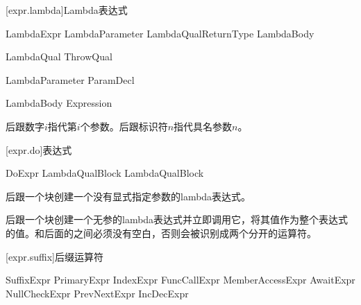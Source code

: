 [expr.lambda]{Lambda表达式}

\begin{bnf}{LambdaExpr}
    LambdaParameter LambdaQual\bnfs ReturnType\bnfq \terminal{=>} LambdaBody
\end{bnf}

\begin{bnf}{LambdaQual}
     \br
    ThrowQual
\end{bnf}

\begin{bnf}{LambdaParameter}
    ParamDecl
\end{bnf}

\begin{bnf}{LambdaBody}
    Expression
\end{bnf}

\pnum
\tcode{\$}后跟数字$i$指代第$i$个参数。\tcode{\$}后跟标识符$n$指代具名参数$n$。

[expr.do]{表达式}

\begin{bnf}{DoExpr}
     LambdaQual\bnfs Block \br
     LambdaQual\bnfs Block
\end{bnf}

\pnum
{}后跟一个块创建一个没有显式指定参数的lambda表达式。

\pnum
{}后跟一个块创建一个无参的lambda表达式并立即调用它，将其值作为整个表达式的值。\enternote {}和后面的\tcode{!}之间必须没有空白，否则会被识别成两个分开的运算符。\exitnote

\enterexample
{}
\exitexample

[expr.suffix]{后缀运算符}

\begin{bnf}{SuffixExpr}
    PrimaryExpr \br
    IndexExpr \br
    FuncCallExpr \br
    MemberAccessExpr \br
    AwaitExpr \br
    NullCheckExpr \br
    PrevNextExpr \br
    IncDecExpr
\end{bnf}

